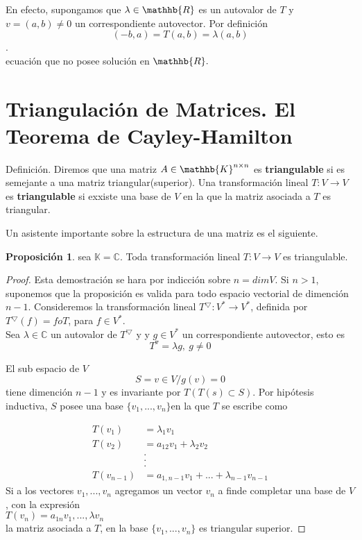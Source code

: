 \documentclass[10pt,a4paper]{article}
\theoremstyle{definition}
\newtheorem{proposition}{Proposición}[section]
\begin{document}
En efecto, supongamos que $\lambda \in \mathhb{R} $ es un autovalor de $T$ y $v = (a,b) \neq 0$ un correspondiente autovector. Por definici\'on \\

$$(-b,a) = T(a,b) = \lambda(a,b)$$. \\
ecuaci\'on que no posee soluci\'on en $\mathhb{R}.$

\section{Triangulaci\'on de Matrices. El Teorema de Cayley-Hamilton}
Definici\'on. Diremos que una matriz $A \in \mathhb{K}^{n \times n}$ es \textbf{triangulable}  si es semejante a una matriz triangular(superior). Una transformaci\'on lineal $T: V \rightarrow V$ es \textbf{triangulable} si exxiste una base de $V$ en la que la matriz asociada a $T$ es triangular.

Un asistente importante sobre la estructura de una matriz es el siguiente.
\begin{proposition}
sea $\mathbb{K = C}$. Toda transformaci\'on lineal $T : V \rightarrow V$ es triangulable.
\begin{proof}
Esta demostraci\'on se hara por indicci\'on sobre $n = dimV $. Si $n>1$, suponemos que la proposici\'on es valida para todo espacio vectorial de dimenci\'on $n-1$. Consideremos la transformaci\'on lineal $T^{\bigtriangledown} :V^{*} \rightarrow V^{*}$, definida por $T^{\bigtriangledown}(f) = foT$, para $f\in V^{*}$.\\
Sea $\lambda \in \mathbb{C}$ un autovalor de $T^{\bigtriangledown}$ y y $g \in V^{*}$ un correspondiente autovector, esto es\\
$$T^{\triangledown} = \lambda g ,~ g\neq 0$$

El sub espacio de $V$ \\

$$S = {v \in V / g(v) = 0}$$
tiene dimenci\'on $n-1$ y es invariante por $T(T(s)\subset S)$. Por hip\'otesis inductiva, $S$ posee una base $\{v_{1},...,v_{n}\}$en la que $T$ se escribe como

\begin{align*}
    	 T(v_{1}) & = \lambda_{1}v_{1}\\
         T(v_{2}) & = a_{12}v_{1} + \lambda_{2}v_{2}\\
                  & .\\
                  & .\\
                  & .\\
       T(v_{n-1}) & = a_{1,n-1}v_{1} +...+ \lambda_{n-1}v_{n-1}
\end{align*}
Si a los vectores $v_{1},...,v_{n}$ agregamos un vector $v_{n}$ a finde completar una base de $V$, con la expresi\'on\\
$T(v_{n}) = a_{1n}v_{1},...,\lambda v_{n}$\\
la matriz asociada a $T$, en la base $\{v_{1},...,v_{n}\}$ es triangular superior.

 

\end{proof}
\end{proposition}
\end{document}
